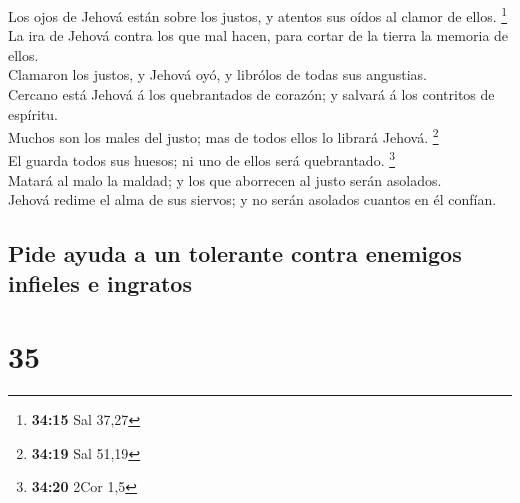  Los ojos de Jehová están sobre los justos, y atentos sus
oídos al clamor de ellos. \footnote{\textbf{34:15} Sal 37,27}\\
 La ira de Jehová contra los que mal hacen, para cortar
de la tierra la memoria de ellos.\\
 Clamaron los justos, y Jehová oyó, y librólos de todas
sus angustias.\\
 Cercano está Jehová á los quebrantados de corazón; y
salvará á los contritos de espíritu.\\
 Muchos son los males del justo; mas de todos ellos lo
librará Jehová. \footnote{\textbf{34:19} Sal 51,19}\\
 El guarda todos sus huesos; ni uno de ellos será
quebrantado. \footnote{\textbf{34:20} 2Cor 1,5}\\
 Matará al malo la maldad; y los que aborrecen al justo
serán asolados.\\
 Jehová redime el alma de sus siervos; y no serán
asolados cuantos en él confían.

\hypertarget{pide-ayuda-a-un-tolerante-contra-enemigos-infieles-e-ingratos}{%
\subsection{Pide ayuda a un tolerante contra enemigos infieles e
ingratos}\label{pide-ayuda-a-un-tolerante-contra-enemigos-infieles-e-ingratos}}

\hypertarget{section-34}{%
\section{35}\label{section-34}}

